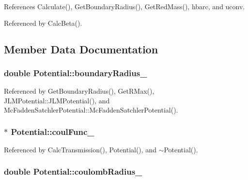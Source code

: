 References Calculate(), Get\-Boundary\-Radius(), Get\-Red\-Mass(), hbarc, and uconv.



Referenced by Calc\-Beta().



\subsection{Member Data Documentation}
\hypertarget{classPotential_a0f692e07a6215ec4605ae1f04c09a926}{
\subsubsection[{boundary\-Radius\-\_\-}]{\setlength{\rightskip}{0pt plus 5cm}double Potential\-::boundary\-Radius\-\_\-\hspace{0.3cm}{\ttfamily [protected]}}}\label{classPotential_a0f692e07a6215ec4605ae1f04c09a926}


Referenced by Get\-Boundary\-Radius(), Get\-R\-Max(), J\-L\-M\-Potential\-::\-J\-L\-M\-Potential(), and Mc\-Fadden\-Satchler\-Potential\-::\-Mc\-Fadden\-Satchler\-Potential().

\hypertarget{classPotential_ab4d202d040f1b759ae2ce7ac6f0010e3}{
\subsubsection[{coul\-Func\-\_\-}]{$\ast$ Potential\-::coul\-Func\-\_\-\hspace{0.3cm}{\ttfamily [protected]}}}\label{classPotential_ab4d202d040f1b759ae2ce7ac6f0010e3}


Referenced by Calc\-Transmission(), Potential(), and $\sim$\-Potential().

\hypertarget{classPotential_a1ca2fe861ed14b351b2f884a6354ce90}{
\subsubsection[{coulomb\-Radius\-\_\-}]{\setlength{\rightskip}{0pt plus 5cm}double Potential\-::coulomb\-Radius\-\_\-\hspace{0.3cm}{\ttfamily [protected]}}}\label{classPotential_a1ca2fe861ed14b351b2f884a6354ce90}


